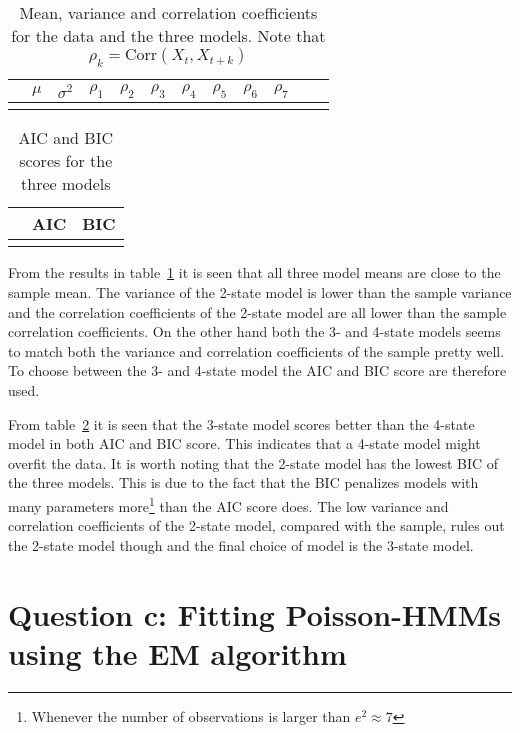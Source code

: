 \begin{table}[ht]
    \centering
    \begin{tabular}{cccccccccccc}
        \hline
         & $\mu$ & $\sigma^2$ & $\rho_1$ & $\rho_2$ & $\rho_3$ & $\rho_4$ & $\rho_5$ & $\rho_6$ & $\rho_7$ \\\hline
        }
    \end{tabular}
    \caption{Mean, variance and correlation coefficients for the data and the three models. Note that $\rho_k=\text{Corr}(X_t, X_{t+k})$}
    \label{tbl:moments-ml-fit}
\end{table}

\begin{table}[ht]
    \centering
    \begin{tabular}{ccc}
        \hline
         & AIC & BIC \\\hline
        }
    \end{tabular}
    \caption{AIC and BIC scores for the three models}
    \label{tbl:aic-bic-ml-fit}
\end{table}

From the results in table~\ref{tbl:moments-ml-fit} it is seen that all three model means are close to the sample mean. The variance of the 2-state model is lower than the sample variance and the correlation coefficients of the 2-state model are all lower than the sample correlation coefficients. On the other hand both the 3- and 4-state models seems to match both the variance and correlation coefficients of the sample pretty well. To choose between the 3- and 4-state model the AIC and BIC score are therefore used.

From table~\ref{tbl:aic-bic-ml-fit} it is seen that the 3-state model scores better than the 4-state model in both AIC and BIC score. This indicates that a 4-state model might overfit the data. It is worth noting that the 2-state model has the lowest BIC of the three models. This is due to the fact that the BIC penalizes models with many parameters more\footnote{Whenever the number of observations is larger than $e^2\approx 7$} than the AIC score does. The low variance and correlation coefficients of the 2-state model, compared with the sample, rules out the 2-state model though and the final choice of model is the 3-state model.


\section*{Question c: Fitting Poisson-HMMs using the EM algorithm}

